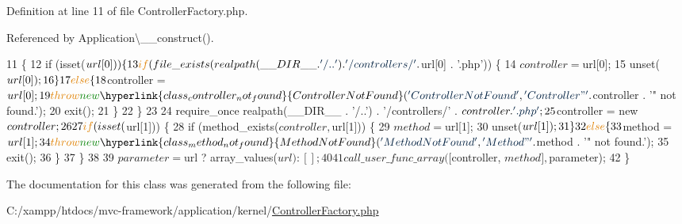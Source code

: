 Definition at line 11 of file Controller\+Factory.\+php.



Referenced by Application\textbackslash{}\+\_\+\+\_\+construct().


\begin{DoxyCode}
11                                                                           \{
12         \textcolor{keywordflow}{if} (isset($url[0])) \{
13             \textcolor{keywordflow}{if} (file\_exists(realpath(\_\_DIR\_\_ . \textcolor{stringliteral}{'/..'}) . \textcolor{stringliteral}{'/controllers/'} . $url[0] . \textcolor{stringliteral}{'.php'})) \{
14                 $controller = $url[0];
15                 unset($url[0]);
16             \}
17             \textcolor{keywordflow}{else} \{
18                 $controller = $url[0];
19                 \textcolor{keywordflow}{throw} \textcolor{keyword}{new} \hyperlink{class_controller_not_found}{ControllerNotFound}(\textcolor{stringliteral}{'ControllerNotFound'}, \textcolor{stringliteral}{'Controller "'} . 
      $controller . \textcolor{stringliteral}{'" not found.'});
20                 exit();
21             \}
22         \}
23         
24         require\_once realpath(\_\_DIR\_\_ . \textcolor{stringliteral}{'/..'}) . \textcolor{stringliteral}{'/controllers/'} . $controller . \textcolor{stringliteral}{'.php'};
25         $controller = \textcolor{keyword}{new} $controller;
26 
27         \textcolor{keywordflow}{if} (isset($url[1])) \{
28             \textcolor{keywordflow}{if} (method\_exists($controller, $url[1])) \{
29                 $method = $url[1];
30                 unset($url[1]);
31             \}
32             \textcolor{keywordflow}{else} \{
33                 $method = $url[1];
34                 \textcolor{keywordflow}{throw} \textcolor{keyword}{new} \hyperlink{class_method_not_found}{MethodNotFound}(\textcolor{stringliteral}{'MethodNotFound'}, \textcolor{stringliteral}{'Method "'} . $method . \textcolor{stringliteral}{'" not
       found.'});
35                 exit();
36             \}
37         \}
38 
39         $parameter = $url ? array\_values($url) : [];
40 
41         call\_user\_func\_array([$controller, $method], $parameter);
42     \}
\end{DoxyCode}


The documentation for this class was generated from the following file\+:\begin{DoxyCompactItemize}
\item 
C\+:/xampp/htdocs/mvc-\/framework/application/kernel/\hyperlink{_controller_factory_8php}{Controller\+Factory.\+php}\end{DoxyCompactItemize}
